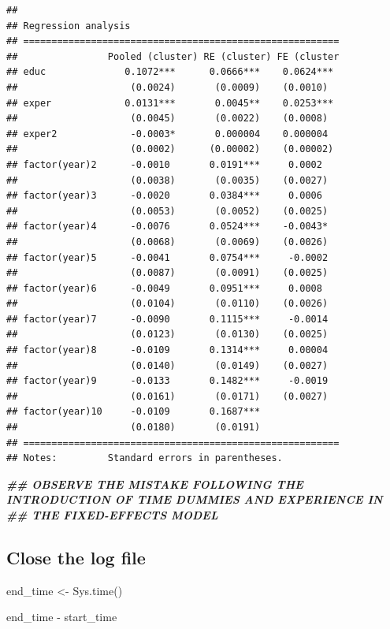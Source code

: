 \documentclass[
]{article}
\newenvironment{Shaded}{\begin{snugshade}}{\end{snugshade}}
\newcommand{\DocumentationTok}[1]{\textcolor[rgb]{0.56,0.35,0.01}{\textbf{\textit{#1}}}}
\newcommand{\FunctionTok}[1]{\textcolor[rgb]{0.00,0.00,0.00}{#1}}
\newcommand{\NormalTok}[1]{#1}
\newcommand{\OtherTok}[1]{\textcolor[rgb]{0.56,0.35,0.01}{#1}}
\newcommand{\SpecialCharTok}[1]{\textcolor[rgb]{0.00,0.00,0.00}{#1}}
\begin{document}
\begin{verbatim}
## 
## Regression analysis
## ========================================================
##                Pooled (cluster) RE (cluster) FE (cluster
## educ              0.1072***      0.0666***    0.0624*** 
##                    (0.0024)       (0.0009)    (0.0010)  
## exper             0.0131***       0.0045**    0.0253*** 
##                    (0.0045)       (0.0022)    (0.0008)  
## exper2             -0.0003*       0.000004    0.000004  
##                    (0.0002)      (0.00002)    (0.00002) 
## factor(year)2      -0.0010       0.0191***     0.0002   
##                    (0.0038)       (0.0035)    (0.0027)  
## factor(year)3      -0.0020       0.0384***     0.0006   
##                    (0.0053)       (0.0052)    (0.0025)  
## factor(year)4      -0.0076       0.0524***    -0.0043*  
##                    (0.0068)       (0.0069)    (0.0026)  
## factor(year)5      -0.0041       0.0754***     -0.0002  
##                    (0.0087)       (0.0091)    (0.0025)  
## factor(year)6      -0.0049       0.0951***     0.0008   
##                    (0.0104)       (0.0110)    (0.0026)  
## factor(year)7      -0.0090       0.1115***     -0.0014  
##                    (0.0123)       (0.0130)    (0.0025)  
## factor(year)8      -0.0109       0.1314***     0.00004  
##                    (0.0140)       (0.0149)    (0.0027)  
## factor(year)9      -0.0133       0.1482***     -0.0019  
##                    (0.0161)       (0.0171)    (0.0027)  
## factor(year)10     -0.0109       0.1687***              
##                    (0.0180)       (0.0191)              
## ========================================================
## Notes:         Standard errors in parentheses.
\end{verbatim}

\begin{Shaded}
\begin{Highlighting}[]
\DocumentationTok{\#\# OBSERVE THE MISTAKE FOLLOWING THE INTRODUCTION OF TIME DUMMIES AND EXPERIENCE IN}
\DocumentationTok{\#\# THE FIXED{-}EFFECTS MODEL}
\end{Highlighting}
\end{Shaded}

\hypertarget{close-the-log-file}{%
\subsection{Close the log file}\label{close-the-log-file}}

\begin{Shaded}
\begin{Highlighting}[]
\NormalTok{end\_time }\OtherTok{\textless{}{-}} \FunctionTok{Sys.time}\NormalTok{()}

\NormalTok{end\_time }\SpecialCharTok{{-}}\NormalTok{ start\_time}
\end{Highlighting}
\end{Shaded}
\end{document}
